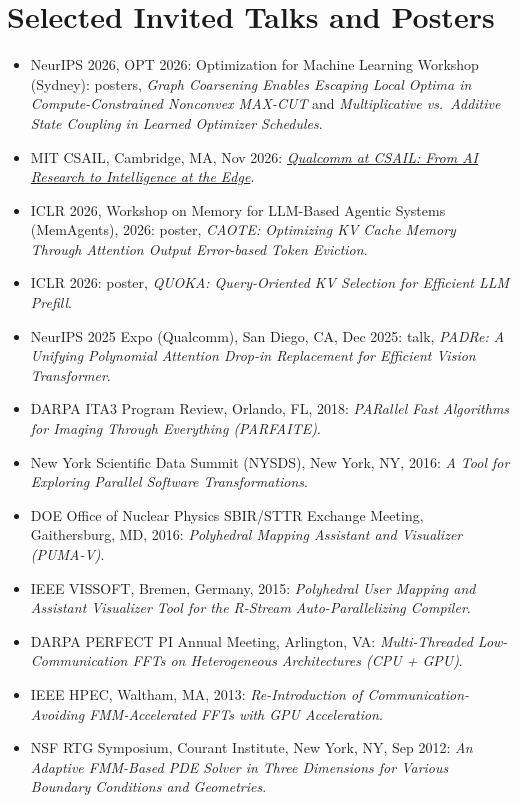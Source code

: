 \documentclass[10pt,letterpaper]{article}
\begin{document}
{\section{Selected Invited Talks and Posters}
\begin{itemize}
  \item NeurIPS 2026, OPT 2026: Optimization for Machine Learning Workshop (Sydney): posters, \textit{Graph Coarsening Enables Escaping Local Optima in Compute-Constrained Nonconvex MAX-CUT} and \textit{Multiplicative vs.\ Additive State Coupling in Learned Optimizer Schedules}.
  \item MIT CSAIL, Cambridge, MA, Nov 2026: \textit{\href{https://www.csail.mit.edu/event/qualcomm-csail-ai-research-intelligence-edge}{Qualcomm at CSAIL: From AI Research to Intelligence at the Edge}}.
  \item ICLR 2026, Workshop on Memory for LLM-Based Agentic Systems (MemAgents), 2026: poster, \textit{CAOTE: Optimizing KV Cache Memory Through Attention Output Error-based Token Eviction}.
  \item ICLR 2026: poster, \textit{QUOKA: Query-Oriented KV Selection for Efficient LLM Prefill}.
  \item NeurIPS 2025 Expo (Qualcomm), San Diego, CA, Dec 2025: talk, \textit{PADRe: A Unifying Polynomial Attention Drop-in Replacement for Efficient Vision Transformer}.
  \item DARPA ITA3 Program Review, Orlando, FL, 2018: \textit{PARallel Fast Algorithms for Imaging Through Everything (PARFAITE)}.
  \item New York Scientific Data Summit (NYSDS), New York, NY, 2016: \textit{A Tool for Exploring Parallel Software Transformations}.
  \item DOE Office of Nuclear Physics SBIR/STTR Exchange Meeting, Gaithersburg, MD, 2016: \textit{Polyhedral Mapping Assistant and Visualizer (PUMA-V)}.
  \item IEEE VISSOFT, Bremen, Germany, 2015: \textit{Polyhedral User Mapping and Assistant Visualizer Tool for the R-Stream Auto-Parallelizing Compiler}.
  \item DARPA PERFECT PI Annual Meeting, Arlington, VA: \textit{Multi-Threaded Low-Communication FFTs on Heterogeneous Architectures (CPU + GPU)}.
  \item IEEE HPEC, Waltham, MA, 2013: \textit{Re-Introduction of Communication-Avoiding FMM-Accelerated FFTs with GPU Acceleration}.
  \item NSF RTG Symposium, Courant Institute, New York, NY, Sep 2012: \textit{An Adaptive FMM-Based PDE Solver in Three Dimensions for Various Boundary Conditions and Geometries}.

\end{itemize}}
\end{document}
